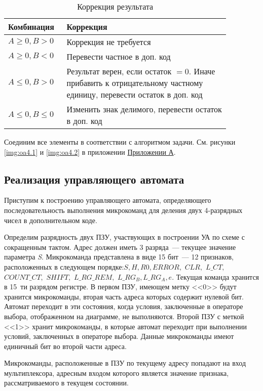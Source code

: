 \documentclass[a4paper,14pt]{extarticle}
\begin{document}
\begin{table}
	\begin{tabular}{|m{0.2\linewidth}|m{0.67\linewidth}|}
		\hline
		\textbf{Комбинация} &\textbf{Коррекция}\\
		\hline
		$A\ge0, B>0 $ & Коррекция не требуется \\ 
		\hline
		$A\ge0, B<0$ & Перевести частное в доп. код\\
		\hline
		$A\le0, B>0$ & Результат верен, если остаток $=0$. Иначе прибавить к отрицательному частному единицу, перевести остаток в доп. код\\
		\hline
		$A\le 0, B\le 0$ & Изменить знак делимого, перевести остаток в доп. код\\
		\hline
	\end{tabular}
	\caption{Коррекция результата}
	\label{tab:correction4}
\end{table}

Соединим все элементы в соответствии с алгоритмом задачи. См. рисунки \ref{img:oa4.1} и \ref{img:oa4.2} в приложении \hyperref[tam]{Приложении А}.

\subsection {Реализация управляющего автомата}
Приступим к построению управляющего автомата, определяющего последовательность выполнения микрокоманд для деления двух 4-разрядных чисел в дополнительном коде.

Определим разрядность двух ПЗУ, участвующих в построении УА по схеме с сокращенным тактом. Адрес должен иметь 3 разряда~--- текущее значение параметра \textit{S}. Микрокоманда представлена в виде 15 бит~--- 12 признаков, расположенных в следующем порядке:\hspace{-1ex}$S, H, R0, ERROR,$ $CLR,$ $L\_CT,$ $COUNT\_CT,$ $SHIFT,$ $L\_RG\_REM,$ $L\_RG_B, L\_RG_A, e$. Текущая команда хранится в 15~ти разрядом регистре. В первом ПЗУ, имеющем метку <<0>> будут хранится микрокоманды, вторая часть адреса которых содержит нулевой бит. Автомат переходит в эти состояния, когда условия, заключенные в операторе выбора, отображенном на диаграмме, не выполняются. Второй ПЗУ с меткой <<1>> хранит микрокоманды, в которые автомат переходит при выполнении условий, заключенных в операторе выбора. Данные микрокоманды имеют единичный бит во второй части адреса.

Микрокоманды, расположенные в ПЗУ по текущему адресу попадают на вход мультиплексора, адресным входом которого является значение признака, рассматриваемого в текущем состоянии.
\end{document}
